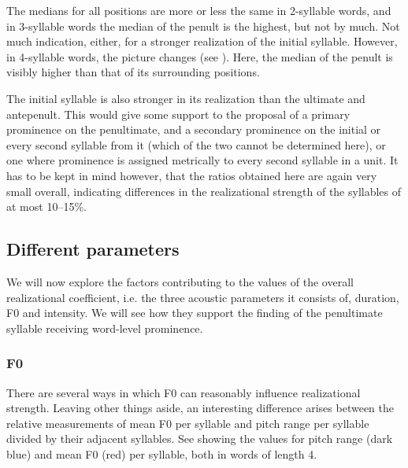 \documentclass[output=paper]{LSP/langsci}
\begin{document}


The medians for all positions are more or less the same in 2-syllable words, and in 3-syllable words the median of the penult is the highest, but not by much. Not much indication, either, for a stronger realization of the initial syllable. However, in 4-syllable words, the picture changes (see ). Here, the median of the penult is visibly higher than that of its surrounding positions.  



The initial syllable is also stronger in its realization than the ultimate and antepenult. This would give some support to the proposal of a primary prominence on the penultimate, and a secondary prominence on the initial or every second syllable from it (which of the two cannot be determined here), or one where prominence is assigned metrically to every second syllable in a unit. It has to be kept in mind however, that the ratios obtained here are again very small overall, indicating differences in the realizational strength of the syllables of at most 10--15\%.

\subsection{Different parameters}
We will now explore the factors contributing to the values of the overall realizational coefficient, i.e. the three acoustic parameters it consists of, duration, F0 and intensity. We will see how they support the finding of the penultimate syllable receiving word-level prominence. 

\subsubsection{F0}
There are several ways in which F0 can reasonably influence realizational strength. Leaving other things aside, an interesting difference arises between the relative measurements of mean F0 per syllable and pitch range per syllable divided by their adjacent syllables. See  showing the values for pitch range (dark blue) and mean F0 (red) per syllable, both in words of length 4.
\end{document}
